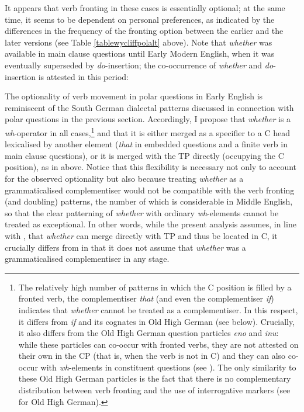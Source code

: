 It appears that verb fronting in these cases is essentially optional; at the same time, it seems to be dependent on personal preferences, as indicated by the differences in the frequency of the fronting option between the earlier and the later versions (see Table \ref{tablewycliffpolalt} above). Note that \textit{whether} was available in main clause questions until Early Modern English, when it was eventually superseded by \textit{do}-insertion; the co-occurrence of \textit{whether} and \textit{do}-insertion is attested in this period:


The optionality of verb movement in polar questions in Early English is reminiscent of the South German dialectal patterns discussed in connection with polar questions in the previous section. Accordingly, I propose that \textit{whether} is a \textit{wh}-operator in all cases,\footnote{The relatively high number of patterns in which the C position is filled by a fronted verb, the complementiser \textit{that} (and even the complementiser \textit{if}) indicates that \textit{whether} cannot be treated as a complementiser. In this respect, it differs from \textit{if} and its cognates in Old High German (see  below). Crucially, it also differs from the Old High German question particles \textit{eno} and \textit{inu}: while these particles can co-occur with fronted verbs, they are not attested on their own in the CP (that is, when the verb is not in C) and they can also co-occur with \textit{wh}-elements in constituent questions (see \citealt[42--44]{axel2007}). The only similarity to these Old High German particles is the fact that there is no complementary distribution between verb fronting and the use of interrogative markers (see \citealt[46]{axel2007} for Old High German).} and that it is either merged as a specifier to a C head lexicalised by another element (\textit{that} in embedded questions and a finite verb in main clause questions), or it is merged with the TP directly (occupying the C position), as in  above. Notice that this flexibility is necessary not only to account for the observed optionality but also because treating \textit{whether} as a grammaticalised complementiser would not be compatible with the verb fronting (and doubling) patterns, the number of which is considerable in Middle English, so that the clear patterning of \textit{whether} with ordinary \textit{wh}-elements cannot be treated as exceptional. In other words, while the present analysis assumes, in line with \citet{vangelderen2009}, that \textit{whether} can merge directly with TP and thus be located in C, it crucially differs from \citet{vangelderen2009} in that it does not assume that \textit{whether} was a grammaticalised complementiser in any stage.

